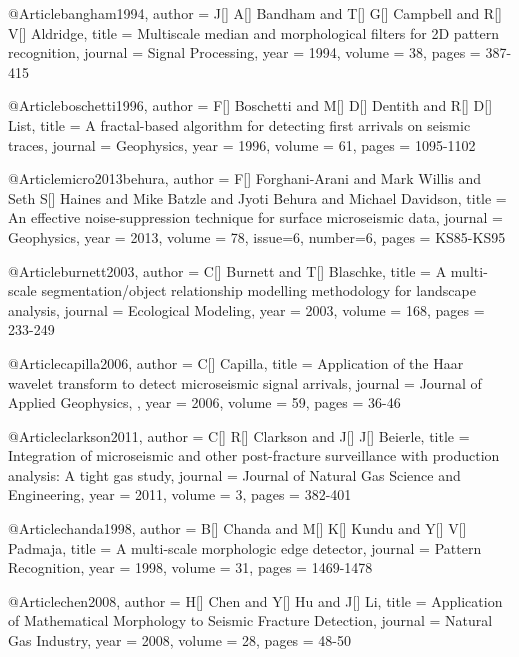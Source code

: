
@Article{bangham1994,
  author = 	 {J[] A[] Bandham and T[] G[] Campbell and R[] V[] Aldridge},
  title = 	 {Multiscale median and morphological filters for 2{D} pattern recognition},
  journal = 	 { Signal Processing},
  year = 	 1994,
  volume = 	 38,
  pages = 	 {387-415}}
  
  @Article{boschetti1996,
  author = 	 {F[] Boschetti and M[] D[] Dentith and R[] D[] List},
  title = 	 {A fractal-based algorithm for detecting first arrivals on seismic traces},
  journal = 	 {Geophysics},
  year = 	 1996,
  volume = 	 61,
  pages = 	 {1095-1102}}

  @Article{micro2013behura,
  author = 	 {F[] Forghani-Arani and Mark Willis and Seth S[] Haines and Mike Batzle and Jyoti Behura and Michael Davidson},
  title = 	 {An effective noise-suppression technique for surface microseismic data},
  journal = 	 {Geophysics},
  year = 	 2013,
  volume = 	 78,
  issue=6,
  number=6,
  pages = 	 {KS85-KS95}}
    
  
  @Article{burnett2003,
  author = 	 {C[] Burnett and T[] Blaschke},
  title = 	 {A multi-scale segmentation/object relationship modelling methodology for landscape analysis},
  journal = 	 {Ecological Modeling},
  year = 	 2003,
  volume = 	 168,
  pages = 	 {233-249}}
  
   @Article{capilla2006,
  author = 	 {C[] Capilla},
  title = 	 {Application of the Haar wavelet transform to detect microseismic signal arrivals},
  journal = 	 {Journal of Applied Geophysics,
},
  year = 	 2006,
  volume = 	 59,
  pages = 	 {36-46}}
  
    @Article{clarkson2011,
  author = 	 {C[] R[] Clarkson and J[] J[] Beierle},
  title = 	 {Integration of microseismic and other post-fracture surveillance
with production analysis: A tight gas study},
  journal = 	 {Journal of Natural Gas Science and Engineering},
  year = 	 2011,
  volume = 	 3,
  pages = 	 {382-401}} 
  
    @Article{chanda1998,
  author = 	 {B[] Chanda and M[] K[] Kundu and Y[] V[] Padmaja},
  title = 	 {A multi-scale morphologic edge detector},
  journal = 	 {Pattern Recognition},
  year = 	 1998,
  volume = 	 31,
  pages = 	 {1469-1478}} 
  
    @Article{chen2008,
  author = 	 {H[] Chen and Y[] Hu and J[] Li},
  title = 	 {Application of Mathematical Morphology to Seismic Fracture Detection},
  journal = 	 {Natural Gas Industry},
  year = 	 2008,
  volume = 	 28,
  pages = 	 {48-50}}   
  
